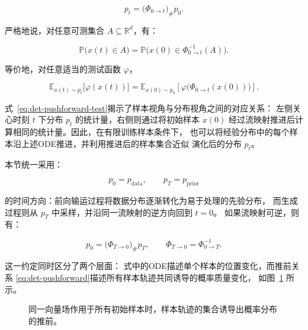 \begin{equation}
    p_t
    =
    \bigl(\Phi_{0\to t}\bigr)_{\#}p_0.
    \label{eq:det-pushforward}
\end{equation}

严格地说，对任意可测集合 $A\subseteq\mathbb{R}^{d}$，有：

\begin{equation}
    \mathbb{P}\bigl(x(t)\in A\bigr)
    =
    \mathbb{P}\bigl(
        x(0)\in\Phi_{0\to t}^{-1}(A)
    \bigr).
    \label{eq:det-pushforward-set}
\end{equation}

等价地，对任意适当的测试函数 $\varphi$，

\begin{equation}
    \mathbb{E}_{x(t)\sim p_t}
    \bigl[\varphi(x(t))\bigr]
    =
    \mathbb{E}_{x(0)\sim p_0}
    \left[
        \varphi\bigl(\Phi_{0\to t}(x(0))\bigr)
    \right].
    \label{eq:det-pushforward-test}
\end{equation}

式~\eqref{eq:det-pushforward-test}揭示了样本视角与分布视角之间的对应关系：
左侧关心时刻 $t$ 下分布 $p_t$ 的统计量，右侧则通过将初始样本
$x(0)$ 经过流映射推进后计算相同的统计量。因此，在有限训练样本条件下，
也可以将经验分布中的每个样本沿上述ODE推进，并利用推进后的样本集合近似
演化后的分布 $p_t$。

本节统一采用：

\[
    p_0=p_{\mathrm{data}},
    \qquad
    p_T=p_{\mathrm{prior}}
\]

的时间方向：前向输运过程将数据分布逐渐转化为易于处理的先验分布，
而生成过程则从 $p_T$ 中采样，并沿同一流映射的逆方向回到 $t=0$。
如果流映射可逆，则有：

\begin{equation}
    p_0
    =
    \bigl(\Phi_{T\to 0}\bigr)_{\#}p_T,
    \qquad
    \Phi_{T\to 0}
    =
    \Phi_{0\to T}^{-1}.
    \label{eq:det-generative-pushforward}
\end{equation}

这一约定同时区分了两个层面：
式中的ODE描述单个样本的位置变化，而推前关系
\eqref{eq:det-pushforward}描述所有样本轨迹共同诱导的概率质量变化，
如图~\ref{fig:pushforward} 所示。

\begin{figure}[htbp]
    \centering
    \caption{同一向量场作用于所有初始样本时，样本轨迹的集合诱导出概率分布的推前。}
    \label{fig:pushforward}
\end{figure}

